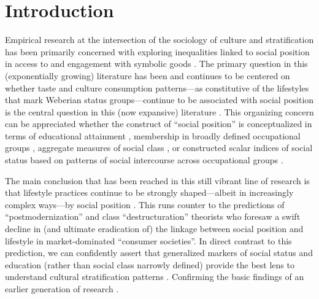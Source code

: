 \newpage
\section{Introduction} 
Empirical research at the intersection of the sociology of culture and stratification has been primarily concerned  with exploring inequalities linked to social position in access to and engagement with symbolic goods  \citep{dimaggio00, vaneijck00, katzgerro04}.  The primary question in this (exponentially growing) literature has been and continues to be centered on whether taste and culture consumption patterns---as constitutive of the lifestyles that mark Weberian status groups---continue to be associated with social position is the central question in this (now expansive) literature \citep{tomlinson03, katzgerro04}.  This organizing concern can be appreciated whether the construct of ``social position'' is conceptualized in terms of educational attainment \citep{bourdieu_darbel91, bryson96, vaneijck99}, membership in broadly defined occupational groups \citep{bourdieu84, dimaggio_useem78a, dimaggio_useem78b, peterson_simkus93, tomlinson03}, aggregate measures of social class \citep{katzgerro_shavit98, katzgerro02, katzgerro06}, or constructed scalar indices of social status based on patterns of social intercourse across occupational groups \citep{chan_goldthorpe05, chan_goldthorpe07a, chan_goldthorpe07b}. 

The main conclusion that has been reached in this still vibrant line of research is that lifestyle practices continue to be strongly shaped---albeit in increasingly complex ways---by social position \citep{holt98, katzgerro99, tomlinson03, emmison03, warde_etal08}. This runs counter to the predictions of ``postmodernization'' and class ``destructuration'' theorists who foresaw a swift decline in (and ultimate eradication of) the linkage between social position and lifestyle in market-dominated ``consumer societies''\citep[e.g.][]{baudrillard06, kingston00, pakulski_waters96}. In direct contrast to this prediction, we can confidently assert that generalized markers of social status and education (rather than social class narrowly defined) provide the best lens to understand cultural stratification patterns \citep{alderson_etal07,chan_goldthorpe07a, chan_goldthorpe07b, katzgerro02, katzgerro04, sullivan_katzgerro07, silva06, bennett_etal99, emmison03, ollivier04}.  Confirming the basic findings of an earlier generation of research \citep{baumol_bowen66, dimaggio_useem78a, ganzeboom82}. 

